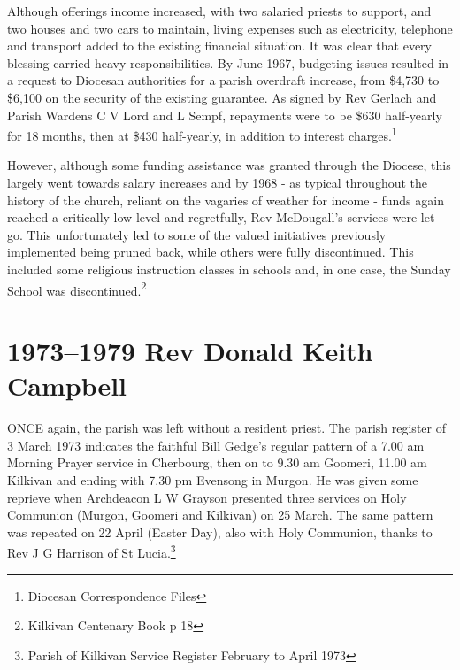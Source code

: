 Although offerings income increased, with two salaried priests to support, and two houses and two cars to maintain, living expenses such as electricity, telephone and transport added to the existing financial situation. It was clear that every blessing carried heavy responsibilities. By June 1967, budgeting issues resulted in a request to Diocesan authorities for a parish overdraft increase, from \$4,730 to \$6,100 on the security of the existing guarantee. As signed by Rev Gerlach and Parish Wardens C V Lord and L Sempf, repayments were to be \$630 half-yearly for 18 months, then at \$430 half-yearly, in addition to interest charges.\footnote{Diocesan Correspondence Files}


However, although some funding assistance was granted through the Diocese, this largely went towards salary increases and by 1968 - as typical throughout the history of the church, reliant on the vagaries of weather for income - funds again reached a critically low level and regretfully, Rev McDougall's services were let go. This unfortunately led to some of the valued initiatives previously implemented being pruned back, while others were fully discontinued. This included some religious instruction classes in schools and, in one case, the Sunday School was discontinued.\footnote{Kilkivan Centenary Book p 18}
\balance


\printendnotes[custom]
\setcounter{endnote}{0}
\chapter{1973--1979 Rev Donald Keith Campbell}
\nobalance


\lettrine[lines=3]{O}{NCE}
 again, the parish was left without a resident priest. The parish register of 3 March 1973 indicates the faithful Bill Gedge's regular pattern of a 7.00 am Morning Prayer service in Cherbourg, then on to 9.30 am Goomeri, 11.00 am Kilkivan and ending with 7.30 pm Evensong in Murgon. He was given some reprieve when Archdeacon L W Grayson presented three services on Holy Communion (Murgon, Goomeri and Kilkivan) on 25 March. The same pattern was repeated on 22 April (Easter Day), also with Holy Communion, thanks to Rev J G Harrison of St Lucia.\footnote{Parish of Kilkivan Service Register February to April 1973}







